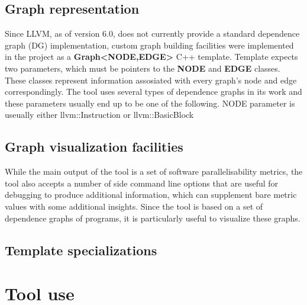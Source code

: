 \subsection{Graph representation} \label{tool-graph-representation}
\qquad Since LLVM, as of version 6.0, does not currently provide a standard dependence graph (DG) implementation, custom graph building facilities were implemented in the project as a \textbf{Graph\textless \textsc{NODE},\textsc{EDGE}\textgreater} C++ template. Template expects two parameters, which must be pointers to the \textbf{NODE} and \textbf{EDGE} classes. These classes represent information assosiated with every graph's node and edge correspondingly. The tool uses several types of dependence graphs in its work and these parameters usually end up to be one of the following. NODE parameter is useually either llvm::Instruction or llvm::BasicBlock   

\subsection{Graph visualization facilities} \label{tool-graph-visualization}
\qquad While the main output of the tool is a set of software parallelisability metrics, the tool also accepts a number of side command line options that are useful for debugging to produce additional information, which can supplement bare metric values with some additional insights. Since the tool is based on a set of dependence graphs of programs, it is particularly useful to visualize these graphs.  

\subsection{Template specializations} \label{tool-template-specs}

\section{Tool use} \label{tool-use}